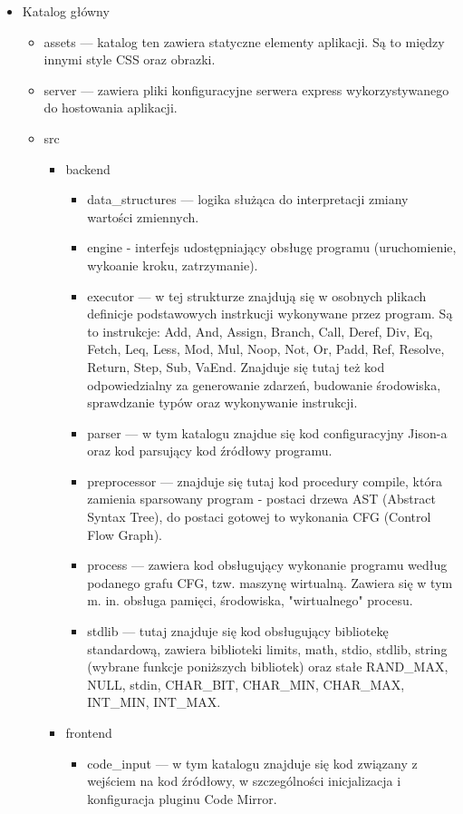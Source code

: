 \documentclass[a4paper,twoside,openright,11pt]{report}
\begin{document}
  \begin {itemize}
    \item Katalog główny
    \begin {itemize}
      \item assets --- katalog ten zawiera statyczne elementy aplikacji. Są to między innymi style CSS oraz obrazki.
      \item server --- zawiera pliki konfiguracyjne serwera express wykorzystywanego do hostowania aplikacji.
      \item src
      \begin {itemize}
        \item backend
	\begin {itemize}
	  \item data\_structures --- logika służąca do interpretacji zmiany wartości zmiennych.
	  \item engine - interfejs udostępniający obsługę programu (uruchomienie, wykoanie kroku, zatrzymanie).
	  \item executor --- w tej strukturze znajdują się w osobnych plikach definicje podstawowych instrkucji wykonywane przez program. Są to instrukcje: Add, And, Assign, Branch, Call, Deref, Div, Eq, Fetch, Leq, Less, Mod, Mul, Noop, Not, Or, Padd, Ref, Resolve, Return, Step, Sub, VaEnd. Znajduje się tutaj też kod odpowiedzialny za generowanie zdarzeń, budowanie środowiska, sprawdzanie typów oraz wykonywanie instrukcji.
	  \item parser --- w tym katalogu znajdue się kod configuracyjny Jison-a oraz kod parsujący kod źródłowy programu.
	  \item preprocessor --- znajduje się tutaj kod procedury compile, która zamienia sparsowany program - postaci drzewa AST (Abstract Syntax Tree), do postaci gotowej to wykonania CFG (Control Flow Graph).
	  \item process --- zawiera kod obsługujący wykonanie programu według podanego grafu CFG, tzw. maszynę wirtualną. Zawiera się w tym m. in. obsługa pamięci, środowiska, "wirtualnego" procesu.
	  \item stdlib --- tutaj znajduje się kod obsługujący bibliotekę standardową, zawiera biblioteki limits, math, stdio, stdlib, string (wybrane funkcje poniższych bibliotek) oraz stałe RAND\_MAX, NULL, stdin, CHAR\_BIT, CHAR\_MIN, CHAR\_MAX, INT\_MIN, INT\_MAX.
	\end {itemize} 
	\item frontend
	\begin {itemize}
	  \item code\_input --- w tym katalogu znajduje się kod związany z wejściem na kod źródłowy, w szczególności inicjalizacja i konfiguracja pluginu Code Mirror.

\end{itemize}
\end{itemize}
\end{itemize}
\end{itemize}
\end{document}
